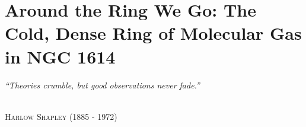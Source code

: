 \pagestyle{fancy}
\headheight 20pt
\chead{}
\lfoot{}
\cfoot{\thepage}
\rfoot{}
\renewcommand{\headrulewidth}{0.1pt}
\renewcommand{\footrulewidth}{0.1pt}
\setlength{\epigraphwidth}{5.in}
\chapter{Around the Ring We Go: The Cold, Dense Ring of Molecular Gas in NGC 1614} \label{chapter2} 
\thispagestyle{fancy} 

\linespread{1.5}
\epigraph{%
\normalsize \textit{``Theories crumble, but good observations never fade.''}}
  {\normalsize \textsc{\\ Harlow Shapley} (1885 - 1972)}
  





%
 

